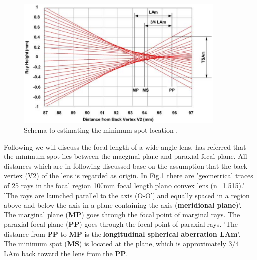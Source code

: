 \begin{figure}[!ht]
\centering
\includegraphics[width=0.9\textwidth]{bilder/min_max_spot}
\caption{Schema to estimating the minimum spot location \cite{lens_theory_LC_Ltd}.}
\label{fig:min_max_spot}
\end{figure}

Following we will discuss the focal length of a wide-angle lens. \cite{lens_theory_LC_Ltd} has referred that the minimum spot lies between the maeginal plane and paraxial focal plane. All distances which are in following discussed base on the assumption that the back vertex (V2) of the lens is regarded as origin. In Fig.\ref{fig:min_max_spot} there are 'geometrical traces of 25 rays in the focal region 100mm focal length plano convex lens (n=1.515).'  'The rays are launched parallel to the axis (O-O') and equally spaced in a region above and below the axis in a plane containing the axis (\textbf{meridional plane})'. The marginal plane (\textbf{MP}) goes through the focal point of marginal rays. The paraxial focal plane (\textbf{PP}) goes through the focal point of paraxial rays. 'The distance from \textbf{PP} to \textbf{MP} is the \textbf{longitudinal spherical aberration LAm}'. The minimum spot (\textbf{MS}) is located at the plane, which is approximately 3/4 LAm back toward the lens from the \textbf{PP}.\\

